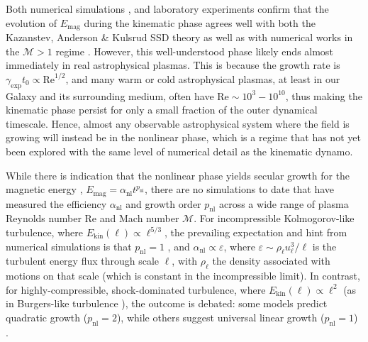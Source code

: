 \documentclass[12pt,twoside]{extreport}
\makeatletter
\newcommand{\mReh}{\ensuremath{\mathrm{Re}}} %
\newcommand{\mSonicMach}{\ensuremath{\mathcal{M}}} %
\providecommand{\DIFaddtex}[1]{{\protect\color{DIFgreen}\uwave{#1}}} %
\providecommand{\DIFdeltex}[1]{{\protect\color{DIFpurple}\sout{#1}}} %
\providecommand{\DIFaddbegin}{} %
\providecommand{\DIFaddend}{} %
\providecommand{\DIFdelbegin}{} %
\providecommand{\DIFdelend}{} %
\providecommand{\DIFadd}[1]{\texorpdfstring{\DIFaddtex{#1}}{#1}} %
\providecommand{\DIFdel}[1]{\texorpdfstring{\DIFdeltex{#1}}{}} %
\providecommand{\DIFscaledelfig}{0.5}
\newlength{\DIFdelgraphicswidth} %
\newlength{\DIFdelgraphicsheight} %
\providecommand{\DIFaddincludegraphics}[2][]{{\color{DIFgreen}\fbox{\DIFOincludegraphics[#1]{#2}}}} %
\providecommand{\DIFdelincludegraphics}[2][]{%
\sbox{\DIFdelgraphicsbox}{\DIFOincludegraphics[#1]{#2}}%
\settoboxwidth{\DIFdelgraphicswidth}{\DIFdelgraphicsbox} %
\settoboxtotalheight{\DIFdelgraphicsheight}{\DIFdelgraphicsbox} %
\scalebox{\DIFscaledelfig}{%
\parbox[b]{\DIFdelgraphicswidth}{\usebox{\DIFdelgraphicsbox}\\[-\baselineskip] \rule{\DIFdelgraphicswidth}{0em}}\llap{\resizebox{\DIFdelgraphicswidth}{\DIFdelgraphicsheight}{%
\setlength{\unitlength}{\DIFdelgraphicswidth}%
\begin{picture}(1,1)%
\thicklines\linethickness{2pt} %
{\color{DIFpurple}\put(0,0){\framebox(1,1){}}}%
{\color{DIFpurple}\put(0,0){\line( 1,1){1}}}%
{\color{DIFpurple}\put(0,1){\line(1,-1){1}}}%
\end{picture}%
}\hspace*{3pt}}} %
} %
\DeclareRobustCommand{\DIFaddbegin}{\DIFOaddbegin \let\includegraphics\DIFaddincludegraphics} %
\DeclareRobustCommand{\DIFaddend}{\DIFOaddend \let\includegraphics\DIFOincludegraphics} %
\DeclareRobustCommand{\DIFdelbegin}{\DIFOdelbegin \let\includegraphics\DIFdelincludegraphics} %
\DeclareRobustCommand{\DIFdelend}{\DIFOaddend \let\includegraphics\DIFOincludegraphics} %
\let\sout@orig\sout %
\renewcommand{\sout}[1]{\ifmmode\text{\sout@orig{\ensuremath{#1}}}\else\sout@orig{#1}\fi} %
\makeatother
\begin{document}
    Both numerical simulations \citep{schekochihin2004simulations, kriel2022fundamental, kriel2025fundamental}, and laboratory experiments \citep{tzeferacos2018laboratory, Bott2021_supersonic_dynamo_in_lab, Bott2021_time_resolved_lab_dynamo} confirm that the evolution of $E_\mathrm{mag}$ during the kinematic phase agrees well with both the Kazanstev, Anderson \& Kulsrud SSD theory \citep{kazantsev1968, kulsrud1992spectrum} as well as with numerical works in the $\mSonicMach > 1$ regime \citep{Federrath2011_supersonic_dynamo, Federrath2014_supersonic_dynamo, kriel2025fundamental}. However, this well-understood phase likely ends almost immediately in real astrophysical plasmas. This is because the growth rate is \DIFdelbegin \DIFdel{$\gamma_\mathrm{exp} t_0 \propto \mReh^{1/2}$}\DIFdelend \DIFaddbegin \DIFadd{$\gamma_\mathrm{exp} t_\mathrm{turb} \propto \mReh^{1/2}$}\DIFaddend , and many warm or cold astrophysical plasmas, at least in our Galaxy and its surrounding medium, often have $\mReh \sim 10^3-10^{10}$, thus making the kinematic phase persist for only a small fraction of the outer dynamical timescale. Hence, almost any observable astrophysical system where the field is growing will instead be in the nonlinear phase, which is a regime that has not yet been explored with the same level of numerical detail as the kinematic dynamo.

    While there is indication that the nonlinear phase yields secular growth for the magnetic energy \citep{beresnyak2012universal, cho2009growth, seta2020seed, galishnikova2022tearing, kriel2025fundamental}, $E_\mathrm{mag} = \alpha_\mathrm{nl} t^{p_\mathrm{nl}}$, there are no simulations to date that have measured the efficiency $\alpha_\mathrm{nl}$ and growth order $p_\mathrm{nl}$ across a wide range of plasma Reynolds number $\mReh$ and Mach number $\mSonicMach$. For incompressible Kolmogorov-like turbulence, where $E_\mathrm{kin}(\ell) \propto \ell^{5/3}$, the prevailing expectation and hint from numerical simulations is that $p_\mathrm{nl} = 1$ \citep{kulsrud1992spectrum, schekochihin2002model, cho2009growth, beresnyak2012universal, xu2016turbulent}, and $\alpha_\mathrm{nl} \propto \varepsilon$, where $\varepsilon \sim \rho_\ell u_\ell^3/\ell$ is the turbulent energy flux through scale $\ell$, with $\rho_\ell$ the density associated with motions on that scale (which is constant in the incompressible limit). In contrast, for highly-compressible, shock-dominated turbulence, where $E_\mathrm{kin}(\ell) \propto \ell^2$ (as in Burgers-like turbulence \citep{Federrath2013_universality, Federrath2021_the_sonic_scale, kriel2025fundamental, beattie2025taking}), the outcome is debated: some models \citep{schleicher2013small, schober2015saturation} predict quadratic growth ($p_\mathrm{nl} = 2$), while others suggest universal linear growth ($p_\mathrm{nl} = 1$) \citep{beresnyak2012universal}.
\end{document}
